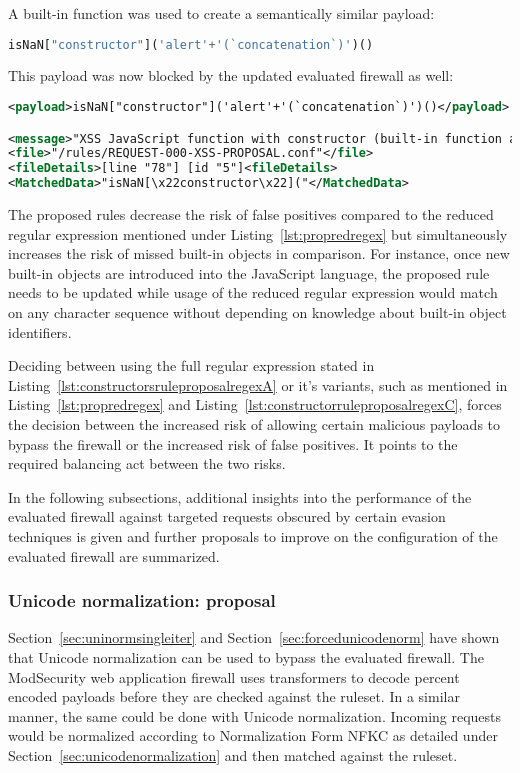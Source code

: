 A built-in function was used to create a semantically similar payload: 

\begin{lstlisting}[style=basicStyle, language=Python]
isNaN["constructor"]('alert'+'(`concatenation`)')()
\end{lstlisting}

This payload was now blocked by the updated evaluated firewall as well:

\begin{lstlisting}[style=ruleStyle, language=XML, caption=Function() constructor bypass using a built-in function blocked, label={lst:constructorsblockedbif}]
<payload>isNaN["constructor"]('alert'+'(`concatenation`)')()</payload>

<message>"XSS JavaScript function with constructor (built-in function access)"</message>
<file>"/rules/REQUEST-000-XSS-PROPOSAL.conf"</file>
<fileDetails>[line "78"] [id "5"]<fileDetails>
<MatchedData>"isNaN[\x22constructor\x22]("</MatchedData>
\end{lstlisting}

The proposed rules decrease the risk of false positives compared to the reduced regular expression mentioned under Listing~\ref{lst:propredregex} but simultaneously increases the risk of missed built-in objects in comparison. For instance, once new built-in objects are introduced into the JavaScript language, the proposed rule needs to be updated while usage of the reduced regular expression would match on any character sequence without depending on knowledge about built-in object identifiers.

Deciding between using the full regular expression stated in Listing~\ref{lst:constructorsruleproposalregexA} or it's variants, such as mentioned in Listing~\ref{lst:propredregex} and Listing~\ref{lst:constructorruleproposalregexC}, forces the decision between the increased risk of allowing certain malicious payloads to bypass the firewall or the increased risk of false positives. It points to the required balancing act between the two risks.

\bigskip
In the following subsections, additional insights into the performance of the evaluated firewall against targeted requests obscured by certain evasion techniques is given and further proposals to improve on the configuration of the evaluated firewall are summarized.


\subsubsection{Unicode normalization: proposal}
\label{sec:unicodenormprop}
Section~\ref{sec:uninormsingleiter} and Section~\ref{sec:forcedunicodenorm} have shown that Unicode normalization can be used to bypass the evaluated firewall.
The ModSecurity web application firewall uses transformers to decode percent encoded payloads before they are checked against the ruleset. In a similar manner, the same could be done with Unicode normalization. Incoming requests would be normalized according to Normalization Form NFKC as detailed under Section~\ref{sec:unicodenormalization} and then matched against the ruleset.

